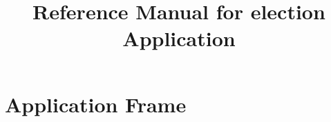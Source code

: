 \documentclass[a4paper]{book}
\title{Reference Manual for election Application}
\begin{document}
\maketitle
\frontmatter
\tableofcontents
\listoffigures
\listoftables
\mainmatter

\part{Application Frame}





\backmatter
\end{document}
